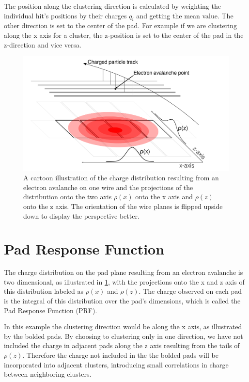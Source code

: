 \documentclass[review]{elsarticle}
\begin{document}
 The position along the clustering direction is calculated by weighting the individual hit's positions by their charges $q_i$ and getting the mean value. The other direction is set to the center of the pad. For example if we are clustering along the x axis for a cluster, the z-position is set to the center of the pad in the z-direction and vice versa. 
 


\begin{figure}[ht!]
\includegraphics[width=\linewidth]{padsat_Large}
\caption{A cartoon illustration of the charge distribution resulting from an electron avalanche on one wire and the projections of the distribution onto the two axis $\rho(x)$ onto the x axis and $\rho(z)$ onto the z axis. The orientation of the wire planes is flipped upside down to display the perspective better.}
\label{fig:prf}
\end{figure}

\section{Pad Response Function}
The charge distribution on the pad plane resulting from an electron avalanche is two dimensional, as illustrated in \ref{fig:prf}, with the projections onto the x and z axis of this distribution labeled as $\rho(x)$ and $\rho(z)$. The charge observed on each pad is the integral of this distribution over the pad's dimensions, which is called the Pad Response Function (PRF).

In this example the clustering direction would be along the x axis, as illustrated by the bolded pads. By choosing to clustering only in one direction, we have not included the charge in adjacent pads along the z axis resulting from the tails of $\rho(z)$. Therefore the charge not included in the the bolded pads will be incorporated into adjacent clusters, introducing small correlations in charge between neighboring clusters. 
\end{document}
